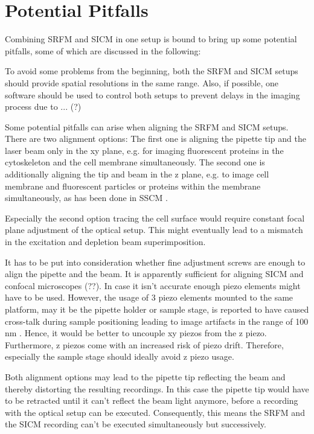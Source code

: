 \section{Potential Pitfalls}
\label{sec:pitfalls}
Combining SRFM and SICM in one setup is bound to bring up some potential
pitfalls, some of which are discussed in the following:

To avoid some problems from the beginning, both the SRFM and SICM setups
should provide spatial resolutions in the same range. Also, if possible, one
software should be used to control both setups to prevent delays in the
imaging process due to ... (?)

Some potential pitfalls can arise when aligning the SRFM and SICM
setups. There are two alignment options: The first one is aligning the pipette
tip and the laser beam only in the xy plane, e.g. for imaging fluorescent
proteins in the cytoskeleton and the cell membrane simultaneously. The second
one is additionally aligning the tip and beam in the z plane, e.g. to image
cell membrane and fluorescent particles or proteins within the membrane
simultaneously, as has been done in SSCM \cite{Gorelik2002a}\cite{Shevchuk2008}.

Especially the second option tracing the cell surface would require constant
focal plane adjustment of the optical setup. This might eventually lead to a
mismatch in the excitation and depletion beam superimposition.

It has to be put into consideration whether fine adjustment screws are enough
to align the pipette and the beam. It is apparently sufficient for aligning
SICM and confocal microscopes (??). In case it isn't accurate enough piezo
elements might have to be used. However, the usage of 3 piezo elements mounted
to the same platform, may it be the pipette holder or sample stage, is
reported to have caused cross-talk during sample positioning leading to image
artifacts in the range of 100 nm \cite{Shevchuk2013}. Hence, it would be
better to uncouple xy piezos from the z piezo. Furthermore, z piezos come with
an increased risk of piezo drift. Therefore, especially the sample stage
should ideally avoid z piezo usage.

Both alignment options may lead to the pipette tip reflecting the beam and
thereby distorting the resulting recordings. In this case the pipette tip
would have to be retracted until it can't reflect the beam light anymore,
before a recording with the optical setup can be executed. Consequently, this
means the SRFM and the SICM recording can't be executed simultaneously but
successively.

